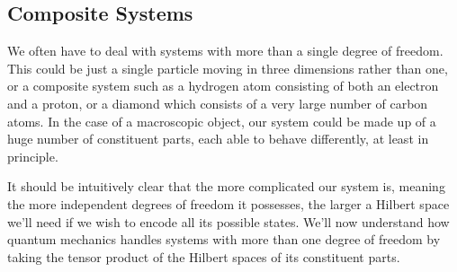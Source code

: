 \documentclass{article}
\theoremstyle{plain}\theoremheaderfont{\normalfont\itshape}\theorembodyfont{\rmfamily}\theoremseparator{.}\newtheorem*{rem}{Remark}\newtheorem*{ex}{Example}\newtheorem*{proof}{Proof}\newtheorem*{altp}{Alternative proof}
\theoremstyle{plain}\theoremheaderfont{\normalfont\bfseries}\theorembodyfont{\rmfamily}\theoremseparator{.}\newtheorem{thm}{Theorem}[section]\newtheorem{lem}[thm]{Lemma}\newtheorem{prop}[thm]{Proposition}\newtheorem*{cor}{Corollary}\newtheorem{defn}[thm]{Definition}\newtheorem{clm}[thm]{Claim}\newtheorem{clminproof}{Claim}
\theoremstyle{break}\theoremheaderfont{\normalfont\itshape}\theorembodyfont{\rmfamily}\theoremseparator{.\medskip}\newtheorem*{proofskip}{Proof}\newtheorem*{exs}{Examples}\newtheorem*{rems}{Remarks}
\theoremstyle{break}\theoremheaderfont{\normalfont\bfseries}\theorembodyfont{\rmfamily}\theoremseparator{.\medskip}\newtheorem{lemskip}[thm]{Lemma}\newtheorem{defnskip}[thm]{Definition}\newtheorem{propskip}[thm]{Proposition}\newtheorem{thmskip}[thm]{Theorem}
\numberwithin{equation}{section}
\begin{document}
    \subsection{Composite Systems}\label{Chap:Composite_Systems}
    We often have to deal with systems with more than a single degree of freedom. This could be just a single particle moving in three dimensions rather than one, or a composite system such as a hydrogen atom consisting of both an electron and a proton, or a diamond which consists of a very large number of carbon atoms. In the case of a macroscopic object, our system could be made up of a huge number of constituent parts, each able to behave differently, at least in principle.

    It should be intuitively clear that the more complicated our system is, meaning the more independent degrees of freedom it possesses, the larger a Hilbert space we'll need if we wish to encode all its possible states. We'll now understand how quantum mechanics handles systems with more than one degree of freedom by taking the tensor product of the Hilbert spaces of its constituent parts.
\end{document}
